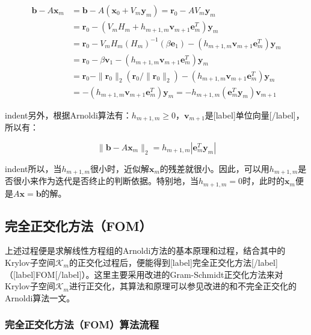 \documentclass[UTF8,nofonts]{ctexart}
\begin{document}
\begin{align*}
\boldsymbol{b}-A\boldsymbol{x}_m&=\boldsymbol{b}-A(\boldsymbol{x}_0+V_m\boldsymbol{y}_m)=\boldsymbol{r}_0-AV_m\boldsymbol{y}_m \\
&=\boldsymbol{r}_0-(V_mH_m+h_{m+1,m}\boldsymbol{v}_{m+1}\boldsymbol{e}_m^T)\boldsymbol{y}_m \\
&=\boldsymbol{r}_0-V_mH_m(H_m)^{-1}(\beta\boldsymbol{e}_1)-(h_{m+1,m}\boldsymbol{v}_{m+1}\boldsymbol{e}_m^T)\boldsymbol{y}_m \\
&=\boldsymbol{r}_0-\beta\boldsymbol{v}_1-(h_{m+1,m}\boldsymbol{v}_{m+1}\boldsymbol{e}_m^T)\boldsymbol{y}_m \\
&=\boldsymbol{r}_0-\|\boldsymbol{r}_0\|_2(\boldsymbol{r}_0/\|\boldsymbol{r}_0\|_2)-(h_{m+1,m}\boldsymbol{v}_{m+1}\boldsymbol{e}_m^T)\boldsymbol{y}_m \\
&=-(h_{m+1,m}\boldsymbol{v}_{m+1}\boldsymbol{e}_m^T)\boldsymbol{y}_m
=-h_{m+1,m}(\boldsymbol{e}_m^T\boldsymbol{y}_m)\boldsymbol{v}_{m+1}
\end{align*}

indent另外，根据Arnoldi算法有：$h_{m+1,m}\geq0$，$\boldsymbol{v}_{m+1}$是[label]单位向量[/label]，所以有：

\begin{equation}
\label{eq:rmnorm}\|\boldsymbol{b}-A\boldsymbol{x}_m\|_2=h_{m+1,m}|\boldsymbol{e}_m^T\boldsymbol{y}_m|
\end{equation}

indent所以，当$h_{m+1,m}$很小时，近似解$\boldsymbol{x}_m$的残差就很小。因此，可以用$h_{m+1,m}$是否很小来作为迭代是否终止的判断依据。特别地，当$h_{m+1,m}=0$时，此时的$\boldsymbol{x}_m$便是$A\boldsymbol{x}=\boldsymbol{b}$的解。

\subsection*{完全正交化方法（FOM）}

上述过程便是求解线性方程组的Arnoldi方法的基本原理和过程，结合其中的Krylov子空间$\mathcal{K}_m$的正交化过程后，便能得到[label]完全正交化方法[/label]（[label]FOM[/label]）。这里主要采用改进的Gram-Schmidt正交化方法来对Krylov子空间$\mathcal{K}_m$进行正交化，其算法和原理可以参见改进的和不完全正交化的Arnoldi算法一文。

\subsubsection*{完全正交化方法（FOM）算法流程}
\end{document}
